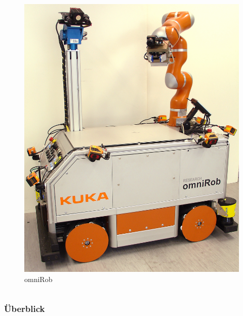 \documentclass[presentation]{beamer}
\begin{document}
\begin{frame}
\begin{columns}[c]
\begin{figure}
		\includegraphics[width=0.95\linewidth]{figures/introduction/Omnirob_dlr_version.jpg}
		\caption{omniRob \cite{Buschor2013}} 
		\label{fig:omnirob}
	\end{figure}
\end{columns} 
\end{frame} 

\begin{frame}
\frametitle{Überblick}
\tableofcontents
\end{frame}

\end{document}
